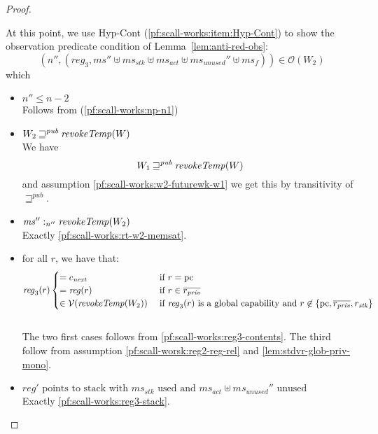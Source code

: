 \documentclass[a4paper]{article}
\newcommand{\var}[1]{\mathit{#1}}
\newcommand{\hs}{\var{ms}}
\newcommand{\ms}{\hs}
\newcommand{\pcreg}{\mathrm{pc}}
\newcommand{\reg}{\var{reg}}
\newcommand{\heap}{\var{mem}}
\newcommand{\stk}{\var{stk}}
\newcommand{\unused}{\var{unused}}
\newcommand{\act}{\var{act}}
\newcommand{\plainfun}[2]{
  \ifthenelse{\equal{#2}{}}
  {\mathit{#1}}
  {\mathit{#1}(#2)}
}
\newcommand{\revokeTemp}[1]{\plainfun{revokeTemp}{#1}}
\newcommand{\futurewk}{\mathbin{\sqsupseteq}^{\var{pub}}}
\newcommand{\heapSat}[3][\heap]{#1 :_{#2} #3}
\newcommand{\memSat}[3][n]{\heapSat[#2]{#1}{#3}}
\newcommand{\asmType}{\plaindom{AsmType}}
\newcommand{\plaindom}[1]{\mathrm{#1}}
\newcommand{\intr}[2]{\mathcal{#1}}
\newcommand{\valueintr}[1]{\intr{V}{#1}}
\newcommand{\stdvr}{\valueintr{\asmType}}
\newcommand{\observations}{\mathcal{O}}
\newcommand{\npair}[2][n]{\left(#1,#2 \right)}
\begin{document}
\begin{proof}
\begin{enumproof}[resume]
      At this point, we use Hyp-Cont (\ref{pf:scall-works:item:Hyp-Cont}) to show the observation predicate condition of Lemma~\ref{lem:anti-red-obs}:
      \[
        \npair[n'']{(reg_3,\ms'' \uplus \ms_\stk \uplus \ms_\act \uplus \ms_\unused'' \uplus \ms_f)} \in \observations(W_2)
      \]
      which 
      \begin{itemize}
      \item $n'' \leq n-2$ \\
        Follows from (\ref{pf:scall-works:np-n1})
      \item $W_2 \futurewk \revokeTemp{W}$ \\
        We have 
        \[
          W_1 \futurewk \revokeTemp{W}
        \]
        and assumption \ref{pf:scall-works:w2-futurewk-w1} we get this by transitivity of $\futurewk$.
      \item $\memSat[n'']{\ms''}{\revokeTemp{W_2}}$ \\
        Exactly \ref{pf:scall-works:rt-w2-memsat}.        
      \item for all $r$, we have that:
        \begin{equation*}
          \reg_3(r)
          \begin{cases}
            = c_{\mathit{next}} &\text{ if } r = \pcreg\\
            = \reg(r)&\text{ if } r \in \overline{r_{\mathit{priv}}}\\
            \in \stdvr(\revokeTemp{W_2}) &\text{ if $\reg_3(r)$ is a global capability and } r \not\in \{\pcreg,\overline{r_{\mathit{priv}}}, r_\stk\} %
          \end{cases}
        \end{equation*}\\
        The two first cases follows from \ref{pf:scall-works:reg3-contents}. The third follow from assumption \ref{pf:scall-worsk:reg2-reg-rel} and \ref{lem:stdvr-glob-priv-mono}.
      \item $\reg' \text{ points to stack with $\ms_\stk$ used and $\ms_\act \uplus \ms_{\mathit{unused}}''$ unused}$\\
        Exactly \ref{pf:scall-works:reg3-stack}.
      \end{itemize}
  \end{enumproof}
\end{proof}
\end{document}
